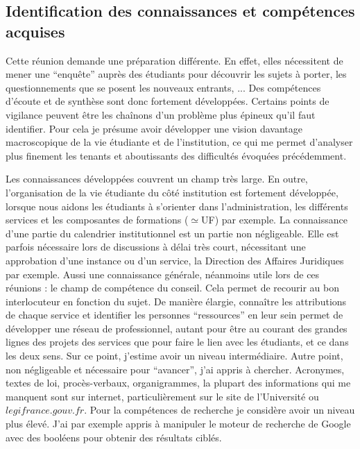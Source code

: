 \documentclass{article}
\begin{document}
\subsection{Identification des connaissances et compétences acquises}
Cette réunion demande une préparation différente. 
En effet, elles nécessitent de mener une ``enquête''  auprès des étudiants pour découvrir les sujets à porter, les questionnements que se posent les nouveaux entrants, ... 
Des compétences d'écoute et de synthèse sont donc fortement développées. 
Certains points de vigilance peuvent être les chaînons d'un problème plus épineux qu'il faut identifier. Pour cela je présume avoir développer une vision davantage macroscopique de la vie étudiante et de l'institution, ce qui me permet d'analyser plus finement les tenants et aboutissants des difficultés évoquées précédemment.\par 
Les connaissances développées couvrent un champ très large. 
En outre, l'organisation de la vie étudiante du côté institution est fortement développée, lorsque nous aidons les étudiants à s'orienter dans l'administration, les différents services et les composantes de formations ($\simeq$UF) par exemple. 
La connaissance d'une partie du calendrier institutionnel est un partie non négligeable. 
Elle est parfois nécessaire lors de discussions à délai très court, nécessitant une approbation d'une instance ou d'un service, la Direction des Affaires Juridiques par exemple.
Aussi une connaissance générale, néanmoins utile lors de ces réunions : le champ de compétence du conseil. 
Cela permet de recourir au bon interlocuteur en fonction du sujet. 
De manière élargie, connaître les attributions de chaque service et identifier les personnes ``ressources'' en leur sein permet de développer une réseau de professionnel, autant pour être au courant des grandes lignes des projets des services que pour faire le lien avec les étudiants, et ce dans les deux sens. Sur ce point, j'estime avoir un niveau intermédiaire.
Autre point, non négligeable et nécessaire pour ``avancer'', j'ai appris à chercher. 
Acronymes, textes de loi, procès-verbaux, organigrammes, la plupart des informations qui me manquent sont sur internet, particulièrement sur le site de l'Université ou $legifrance.gouv.fr$. 
Pour la compétences de recherche je considère avoir un niveau plus élevé. J'ai par exemple appris à manipuler le moteur de recherche de Google avec des booléens pour obtenir des résultats ciblés.

\newpage
\end{document}
